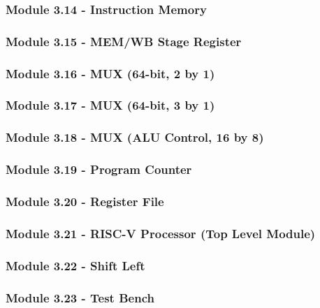 \documentclass[12pt]{article}
\begin{document}
\subsubsection*{\large Module 3.14 - Instruction Memory}

\subsubsection*{\large Module 3.15 - MEM/WB Stage Register}
\label{mem_wb}

\subsubsection*{\large Module 3.16 - MUX (64-bit, 2 by 1)}

\subsubsection*{\large Module 3.17 - MUX (64-bit, 3 by 1)}

\subsubsection*{\large Module 3.18 - MUX (ALU Control, 16 by 8)}
\label{muxc}

\subsubsection*{\large Module 3.19 - Program Counter}
\label{pc}

\subsubsection*{\large Module 3.20 - Register File}

\subsubsection*{\large Module 3.21 - RISC-V Processor (Top Level Module)}
\label{tlmp}

\subsubsection*{\large Module 3.22 - Shift Left}

\subsubsection*{\large Module 3.23 - Test Bench}

\end{document}

